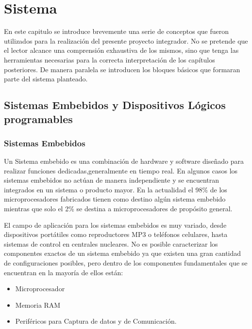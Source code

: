 \chapter{Sistema}
En este capitulo se introduce brevemente una serie de conceptos que fueron utilizados para la realización del presente proyecto integrador. No se pretende que el lector alcance una comprensión exhaustiva de los mismos, sino que tenga las herramientas necesarias para la correcta interpretación de los capítulos posteriores. De manera paralela se introducen los bloques básicos que formaran parte del sistema planteado.

\section{Sistemas Embebidos y Dispositivos Lógicos programables}

\subsection{Sistemas Embebidos}
Un Sistema embebido es una combinación de hardware y software diseñado para realizar funciones dedicadas,generalmente en tiempo real. En algunos casos los sistemas embebidos no actúan de manera independiente y se encuentran integrados en un sistema o producto mayor.
En la actualidad el 98\% de los microprocesadores fabricados tienen como destino algún sistema embebido mientras que solo el 2\% se destina a microprocesadores de propósito general.

El campo de aplicación para los sistemas embebidos es muy variado, desde dispositivos portátiles como reproductores MP3 o teléfonos celulares, hasta sistemas de control en centrales nucleares.
No es posible caracterizar los componentes exactos de un sistema embebido ya que existen una gran cantidad de configuraciones posibles, pero dentro de los componentes fundamentales que se encuentran en la mayoría de ellos están:

\begin{itemize}
\item Microprocesador
\item Memoria RAM 
\item Periféricos para Captura de datos y de Comunicación.
\end{itemize}

